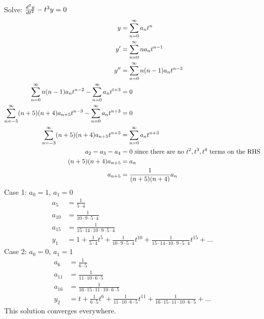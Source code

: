 \documentclass[12pt]{article}
\begin{document}
\begin{example} Solve: $\frac{d^2y}{dt^2} - t^3y = 0$ $$\begin{aligned} y &= \sum_{n = 0}^{\infty} a_nt^n \\ y' &= \sum_{n = 0}^{\infty} na_nt^{n - 1} \\ y'' &= \sum_{n = 0}^{\infty} n(n - 1)a_nt^{n - 2} \\ \sum_{n = 0}^{\infty} n(n - 1)a_nt^{n - 2} - \sum_{n = 0}^{\infty} a_nt^{t + 3} &= 0 \\ \sum_{n = -5}^{\infty} (n + 5)(n + 4)a_{n + 5}t^{n - 3} - \sum_{n = 0}^{\infty} a_nt^{n + 3} &= 0 \\ \sum_{n = -3}^{\infty} (n + 5)(n + 4)a_{n + 5}t^{n + 3} &= \sum_{n = 0}^{\infty} a_nt^{n + 3} \\ a_2 = a_3 = a_4 &= 0 \text{ since there are no } t^2, t^3, t^4 \text{ terms on the RHS} \\ (n + 5)(n + 4)a_{n + 5} &= a_n \\ a_{n + 5} &= \frac{1}{(n + 5)(n + 4)}a_n \end{aligned} $$ 
Case 1: $a_0 = 1$, $a_1 = 0$ $$\begin{aligned} a_5 &= \frac{1}{5 \cdot 4} \\ a_{10} &= \frac{1}{10 \cdot 9 \cdot 5 \cdot 4} \\ a_{15} &= \frac{1}{15 \cdot 14 \cdot 10 \cdot 9 \cdot 5 \cdot 4} \\ y_1 &= 1 + \frac{1}{5 \cdot 4}t^5 + \frac{1}{10 \cdot 9 \cdot 5 \cdot 4}t^{10} + \frac{1}{15 \cdot 14 \cdot 10 \cdot 9 \cdot 5 \cdot 4}t^{15} + \dots \end{aligned} $$ 
Case 2: $a_0 = 0$, $a_1 = 1$ $$\begin{aligned} a_6 &= \frac{1}{6 \cdot 5} \\ a_{11} &= \frac{1}{11 \cdot 10 \cdot 6 \cdot 5} \\ a_{16} &= \frac{1}{16 \cdot 15 \cdot 11 \cdot 10 \cdot 6 \cdot 5} \\ y_2 &= t + \frac{1}{6 \cdot 5}t^6 + \frac{1}{11 \cdot 10 \cdot 6 \cdot 5}t^{11} + \frac{1}{16 \cdot 15 \cdot 11 \cdot 10 \cdot 6 \cdot 5} + \dots \end{aligned} $$ This solution converges everywhere. \end{example} 
\end{document}
